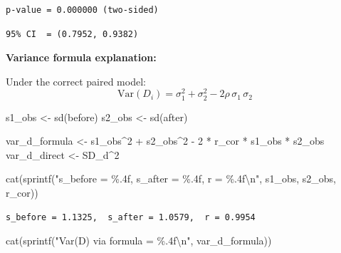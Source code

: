 \documentclass[
  letterpaper,
  DIV=11,
  numbers=noendperiod]{scrartcl}
\newenvironment{Shaded}{\begin{snugshade}}{\end{snugshade}}
\newcommand{\DecValTok}[1]{\textcolor[rgb]{0.68,0.00,0.00}{#1}}
\newcommand{\FunctionTok}[1]{\textcolor[rgb]{0.28,0.35,0.67}{#1}}
\newcommand{\NormalTok}[1]{\textcolor[rgb]{0.00,0.23,0.31}{#1}}
\newcommand{\OtherTok}[1]{\textcolor[rgb]{0.00,0.23,0.31}{#1}}
\newcommand{\SpecialCharTok}[1]{\textcolor[rgb]{0.37,0.37,0.37}{#1}}
\newcommand{\StringTok}[1]{\textcolor[rgb]{0.13,0.47,0.30}{#1}}
\begin{document}
\begin{verbatim}
p-value = 0.000000 (two-sided)
\end{verbatim}

\begin{Shaded}
\end{Shaded}

\begin{verbatim}
95% CI  = (0.7952, 0.9382)
\end{verbatim}

\textbf{Variance formula explanation:}

Under the correct paired model:
\[\text{Var}(D_i) = \sigma_1^2 + \sigma_2^2 - 2\rho\,\sigma_1\,\sigma_2\]

\begin{Shaded}
\begin{Highlighting}[]
\NormalTok{s1\_obs }\OtherTok{\textless{}{-}} \FunctionTok{sd}\NormalTok{(before)}
\NormalTok{s2\_obs }\OtherTok{\textless{}{-}} \FunctionTok{sd}\NormalTok{(after)}

\NormalTok{var\_d\_formula }\OtherTok{\textless{}{-}}\NormalTok{ s1\_obs}\SpecialCharTok{\^{}}\DecValTok{2} \SpecialCharTok{+}\NormalTok{ s2\_obs}\SpecialCharTok{\^{}}\DecValTok{2} \SpecialCharTok{{-}} \DecValTok{2} \SpecialCharTok{*}\NormalTok{ r\_cor }\SpecialCharTok{*}\NormalTok{ s1\_obs }\SpecialCharTok{*}\NormalTok{ s2\_obs}
\NormalTok{var\_d\_direct  }\OtherTok{\textless{}{-}}\NormalTok{ SD\_d}\SpecialCharTok{\^{}}\DecValTok{2}

\FunctionTok{cat}\NormalTok{(}\FunctionTok{sprintf}\NormalTok{(}\StringTok{"s\_before = \%.4f,  s\_after = \%.4f,  r = \%.4f}\SpecialCharTok{\textbackslash{}n}\StringTok{"}\NormalTok{,}
\NormalTok{            s1\_obs, s2\_obs, r\_cor))}
\end{Highlighting}
\end{Shaded}

\begin{verbatim}
s_before = 1.1325,  s_after = 1.0579,  r = 0.9954
\end{verbatim}

\begin{Shaded}
\begin{Highlighting}[]
\FunctionTok{cat}\NormalTok{(}\FunctionTok{sprintf}\NormalTok{(}\StringTok{"Var(D) via formula = \%.4f}\SpecialCharTok{\textbackslash{}n}\StringTok{"}\NormalTok{, var\_d\_formula))}
\end{Highlighting}
\end{Shaded}
\end{document}

